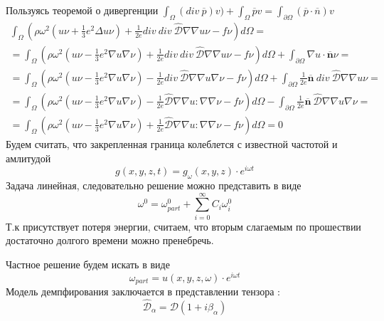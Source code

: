 \documentclass[a4paper,12pt]{article}
\begin{document}
Пользуясь теоремой о дивергенции  $\int_{\Omega}(div \:\overline{p}) v) + \int_\Omega\overline{p}v = \int_{\partial\Omega} (\overline{p} \cdot \overline{n}) v $ 
\begin{align}
\int_\Omega (\rho \omega^2 (u \nu + \frac{1}{3}e^2 \Delta u \nu) + \frac{1}{2e} div \: div \: \hat{\mathcal{D}} \nabla \nabla u \nu -f\nu)d\Omega = \\
=\int_\Omega (\rho \omega^2 (u \nu - \frac{1}{3}e^2 \nabla u \nabla \nu) + \frac{1}{2e} div \: div \: \hat{\mathcal{D}} \nabla \nabla u \nu -f\nu)d\Omega + \int_{\partial \Omega} \nabla u \cdot \overline{\textbf{n}}\nu = \\
=\int_\Omega (\rho \omega^2 (u \nu - \frac{1}{3}e^2 \nabla u \nabla \nu) - \frac{1}{2e}  div \: \hat{\mathcal{D}} \nabla \nabla u \nabla \nu -f\nu)d\Omega +\int_{\partial \Omega} \frac{1}{2e} \overline{\textbf{n}} \: div \:  \hat{\mathcal{D}} \nabla \nabla u  \nu  = \\
=\int_\Omega (\rho \omega^2 (u \nu - \frac{1}{3}e^2 \nabla u \nabla \nu) - \frac{1}{2e} \hat{\mathcal{D}} \nabla \nabla u : \nabla \nabla \nu -f\nu)d\Omega - \int_{\partial \Omega} \frac{1}{2e} \overline{\textbf{n}} \: \hat{\mathcal{D}} \nabla \nabla u \nabla \nu = \\
=\int_\Omega (\rho \omega^2 (u \nu - \frac{1}{3}e^2 \nabla u \nabla \nu) + \frac{1}{2e} \hat{\mathcal{D}} \nabla \nabla u : \nabla \nabla \nu -f\nu)d\Omega = 0  
\end{align}
Будем считать, что закрепленная граница колеблется с известной частотой и амлитудой
\begin{equation}
    g(x,y,z,t) = g_\omega(x,y,z)\cdot e^{i\omega t}
\end{equation}
Задача линейная, следовательно решение можно представить в виде
\begin{equation}
    \omega^0 = \omega^0_{part} +  \sum_{i=0}^{\infty} C_i \omega^0_i 
\end{equation}
Т.к присутствует потеря энергии, считаем, что вторым слагаемым по прошествии достаточно долгого времени можно пренебречь.
\par Частное решение будем искать в виде
\begin{equation}
    \omega_{part} = u(x,y,z,\omega) \cdot e^{i\omega t}
\end{equation}
Модель демпфирования заключается в представлении тензора :
\begin{equation}
    \mathcal{\hat{D}_\alpha} = \mathcal{D}(1 + i\beta_\alpha)
\end{equation}
\end{document}
